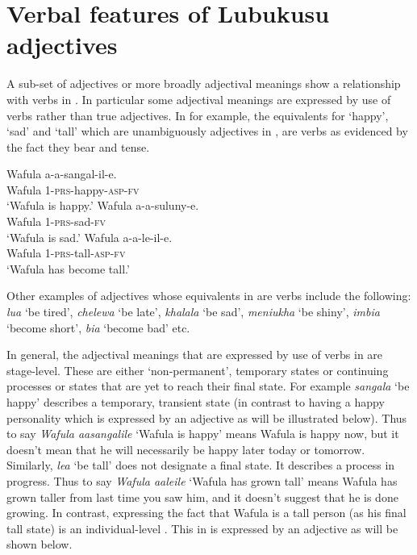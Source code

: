 \documentclass[output=paper,
modfonts
]{langscibook}
\begin{document}
\section{Verbal features of Lubukusu adjectives}\label{sec:wasike:4}

A sub-set of adjectives or more broadly adjectival meanings show a relationship with verbs in . In particular some adjectival meanings are expressed by use of verbs rather than true adjectives. In  for example, the  equivalents for ‘happy’, ‘sad’ and ‘tall’ which are unambiguously adjectives in , are verbs as evidenced by the fact they bear  and tense.

\ea\label{ex:wasike:22}
\ea
\gll Wafula a-a-sangal-il-e.\\
     Wafula 1-\textsc{prs}-happy-\textsc{asp}-\textsc{fv}\\
\glt ‘Wafula is happy.’
\ex
\gll  Wafula a-a-suluny-e.\\
     Wafula 1-\textsc{prs}-sad-\textsc{fv}\\
\glt ‘Wafula is sad.’
\ex
\gll  Wafula a-a-le-il-e.\\
     Wafula 1-\textsc{prs}-tall-\textsc{asp}-\textsc{fv}\\
\glt ‘Wafula has become tall.’
\z
\z

Other examples of  adjectives whose equivalents in  are verbs include the following: \textit{lua} ‘be tired’, \textit{chelewa} ‘be late’, \textit{khalala} ‘be sad’, \textit{meniukha} ‘be shiny’, \textit{imbia} ‘become short’, \textit{bia} ‘become bad’ etc.

In general, the adjectival meanings that are expressed by use of verbs in  are stage-level. These are either ‘non-permanent’, temporary states or continuing processes or states that are yet to reach their final state. For example \textit{sangala} ‘be happy’ describes a temporary, transient state (in contrast to having a happy personality which is expressed by an adjective as will be illustrated below). Thus to say \textit{Wafula aasangalile} ‘Wafula is happy’ means Wafula is happy now, but it doesn’t mean that he will necessarily be happy later today or tomorrow. Similarly, \textit{lea} ‘be tall’ does not designate a final state. It describes a process in progress. Thus to say \textit{Wafula aaleile} ‘Wafula has grown tall’ means Wafula has grown taller from last time you saw him, and it doesn’t suggest that he is done growing. In contrast, expressing the fact that Wafula is a tall person (as his final tall state) is an individual-level . This in  is expressed by an adjective as will be shown below. 
\end{document}
